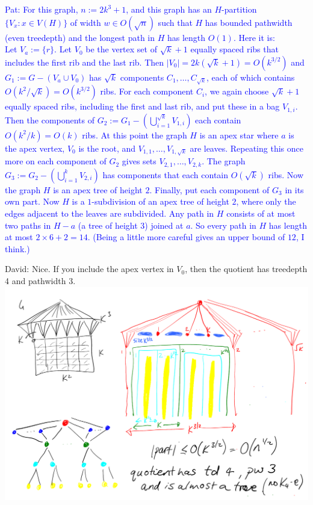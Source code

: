 \documentclass{patmorin}
\newcommand{\david}[1]{{\color{orange} David: #1}}
\newcommand{\pat}[1]{\textcolor{Blue}{Pat: #1}}
\begin{document}
\pat{For this graph, $n:=2k^3+1$, and this graph has an $H$-partition $\{V_x:x\in V(H)\}$ of width $w\in O(\sqrt{n})$ such that $H$ has bounded pathwidth (even treedepth) and the longest path in $H$ has length $O(1)$.  Here it is:\\[2ex]
Let $V_a:=\{r\}$.  Let $V_0$ be the vertex set of $\sqrt{k}+1$ equally spaced ribs that includes the first rib and the last rib. Then $|V_0|=2k(\sqrt{k}+1)=O(k^{3/2})$ and $G_1:=G-(V_a\cup V_0)$ has $\sqrt{k}$ components $C_1,\ldots,C_{\sqrt{k}}$, each of which contains $O(k^2/\sqrt{k})=O(k^{3/2})$ ribs.  For each component $C_i$, we again choose $\sqrt{k}+1$ equally spaced ribs, including the first and last rib, and put these in a bag $V_{1,i}$.  Then the components of $G_2:=G_1-(\bigcup_{i=1}^{\sqrt{k}} V_{1,i})$ each contain $O(k^2/k)=O(k)$ ribs.  At this point the graph $H$ is an apex star where $a$ is the apex vertex, $V_0$ is the root, and $V_{1,1},\ldots,V_{1,\sqrt{k}}$ are leaves.  Repeating this once more on each component of $G_2$ gives sets $V_{2,1},\ldots,V_{2,k}$. The graph $G_3:=G_2-(\bigcup_{i=1}^{k} V_{2,i})$ has components that each contain $O(\sqrt{k})$ ribs. Now the graph $H$ is an apex tree of height $2$.  Finally, put each component of $G_3$ in its own part.  Now $H$ is a $1$-subdivision of an apex tree of height $2$, where only the edges adjacent to the leaves are subdivided.  Any path in $H$ consists of at most two paths in $H-a$ (a tree of height $3$) joined at $a$.  So every path in $H$ has length at most $2\times 6 + 2 = 14$.  (Being a little more careful gives an upper bound of $12$, I think.)}

\david{Nice. If you include the apex vertex in $V_0$, then the quotient has treedepth 4 and pathwidth 3. \\
\includegraphics[page=1,width=\textwidth]{sqrtnTreePartitions.pdf}
}
\end{document}

